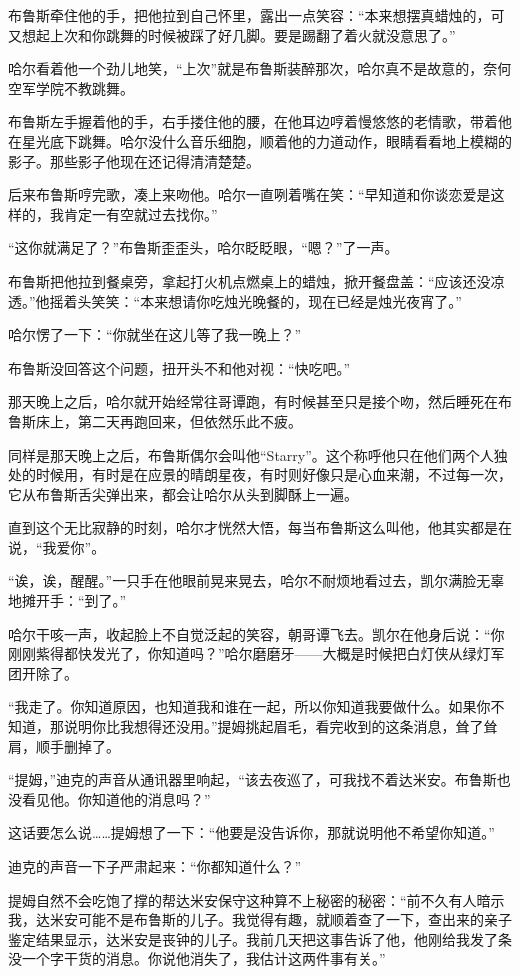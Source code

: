 \documentclass[../main]{subfiles}
\begin{document}
布鲁斯牵住他的手，把他拉到自己怀里，露出一点笑容：“本来想摆真蜡烛的，可又想起上次和你跳舞的时候被踩了好几脚。要是踢翻了着火就没意思了。”

哈尔看着他一个劲儿地笑，“上次”就是布鲁斯装醉那次，哈尔真不是故意的，奈何空军学院不教跳舞。

布鲁斯左手握着他的手，右手搂住他的腰，在他耳边哼着慢悠悠的老情歌，带着他在星光底下跳舞。哈尔没什么音乐细胞，顺着他的力道动作，眼睛看看地上模糊的影子。那些影子他现在还记得清清楚楚。

后来布鲁斯哼完歌，凑上来吻他。哈尔一直咧着嘴在笑：“早知道和你谈恋爱是这样的，我肯定一有空就过去找你。”

“这你就满足了？”布鲁斯歪歪头，哈尔眨眨眼，“嗯？”了一声。

布鲁斯把他拉到餐桌旁，拿起打火机点燃桌上的蜡烛，掀开餐盘盖：“应该还没凉透。”他摇着头笑笑：“本来想请你吃烛光晚餐的，现在已经是烛光夜宵了。”

哈尔愣了一下：“你就坐在这儿等了我一晚上？”

布鲁斯没回答这个问题，扭开头不和他对视：“快吃吧。”

那天晚上之后，哈尔就开始经常往哥谭跑，有时候甚至只是接个吻，然后睡死在布鲁斯床上，第二天再跑回来，但依然乐此不疲。

同样是那天晚上之后，布鲁斯偶尔会叫他“Starry”。这个称呼他只在他们两个人独处的时候用，有时是在应景的晴朗星夜，有时则好像只是心血来潮，不过每一次，它从布鲁斯舌尖弹出来，都会让哈尔从头到脚酥上一遍。

直到这个无比寂静的时刻，哈尔才恍然大悟，每当布鲁斯这么叫他，他其实都是在说，“我爱你”。

“诶，诶，醒醒。”一只手在他眼前晃来晃去，哈尔不耐烦地看过去，凯尔满脸无辜地摊开手：“到了。”

哈尔干咳一声，收起脸上不自觉泛起的笑容，朝哥谭飞去。凯尔在他身后说：“你刚刚紫得都快发光了，你知道吗？”哈尔磨磨牙——大概是时候把白灯侠从绿灯军团开除了。

“我走了。你知道原因，也知道我和谁在一起，所以你知道我要做什么。如果你不知道，那说明你比我想得还没用。”提姆挑起眉毛，看完收到的这条消息，耸了耸肩，顺手删掉了。

“提姆，”迪克的声音从通讯器里响起，“该去夜巡了，可我找不着达米安。布鲁斯也没看见他。你知道他的消息吗？”

这话要怎么说……提姆想了一下：“他要是没告诉你，那就说明他不希望你知道。”

迪克的声音一下子严肃起来：“你都知道什么？”

提姆自然不会吃饱了撑的帮达米安保守这种算不上秘密的秘密：“前不久有人暗示我，达米安可能不是布鲁斯的儿子。我觉得有趣，就顺着查了一下，查出来的亲子鉴定结果显示，达米安是丧钟的儿子。我前几天把这事告诉了他，他刚给我发了条没一个字干货的消息。你说他消失了，我估计这两件事有关。”
\end{document}
